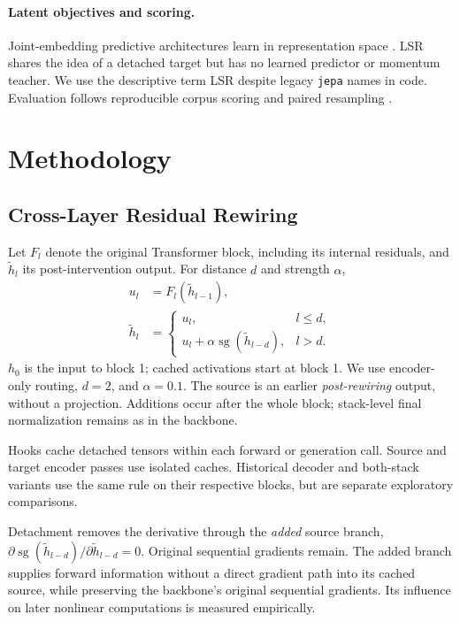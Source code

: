\documentclass[11pt]{article}
\newcommand{\sg}{\operatorname{sg}}
\begin{document}
\paragraph{Latent objectives and scoring.}
Joint-embedding predictive architectures learn in representation space \citep{assran-etal-2023-ijepa}. LSR shares the idea of a detached target but has no learned predictor or momentum teacher. We use the descriptive term LSR despite legacy \texttt{jepa} names in code. Evaluation follows reproducible corpus scoring \citep{post-2018-call,popovic-2017-chrf} and paired resampling \citep{koehn-2004-statistical}.

\section{Methodology}
\subsection{Cross-Layer Residual Rewiring}
Let $F_l$ denote the original Transformer block, including its internal residuals, and $\widetilde h_l$ its post-intervention output. For distance $d$ and strength $\alpha$,
\begin{align}
u_l &= F_l(\widetilde h_{l-1}),\\
\widetilde h_l &= \begin{cases}
u_l, & l\leq d,\\
u_l+\alpha\sg(\widetilde h_{l-d}), & l>d.
\end{cases}
\label{eq:clrr}
\end{align}
$h_0$ is the input to block 1; cached activations start at block 1. We use encoder-only routing, $d=2$, and $\alpha=0.1$. The source is an earlier \emph{post-rewiring} output, without a projection. Additions occur after the whole block; stack-level final normalization remains as in the backbone.

Hooks cache detached tensors within each forward or generation call. Source and target encoder passes use isolated caches. Historical decoder and both-stack variants use the same rule on their respective blocks, but are separate exploratory comparisons.

Detachment removes the derivative through the \emph{added} source branch, $\partial\sg(\widetilde h_{l-d})/\partial\widetilde h_{l-d}=0$. Original sequential gradients remain. The added branch supplies forward information without a direct gradient path into its cached source, while preserving the backbone's original sequential gradients. Its influence on later nonlinear computations is measured empirically.
\end{document}

